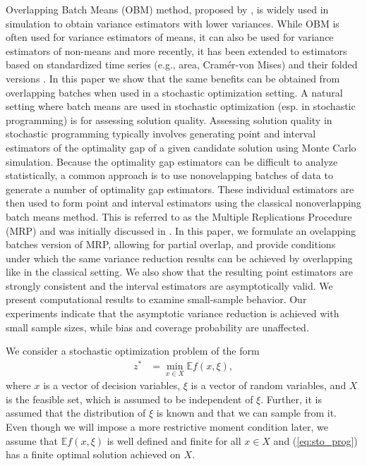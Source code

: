 \documentclass[12pt]{article}
\newcommand{\e}[1]{\mathbb{E} %
#1 %
}
\newcommand{\x}{x}
\newcommand{\xit}{\xi}
\begin{document}
Overlapping Batch Means (OBM) method, proposed by \citet{Meketon1984}, is widely used in simulation to obtain variance estimators with lower variances. 
While OBM is often used for variance estimators of means, it can also be used for variance estimators of non-means \citep{SAH90} and more recently, it has been extended to estimators based on standardized time series (e.g., area, Cram\'{e}r-von Mises) \citep{Alexopoulos01012007,Alexopoulos2007} and their folded versions \citep{Meterelliyoz_etal_12}.
In this paper we show that the same benefits can be obtained from overlapping batches when used in a stochastic optimization setting.  
A natural setting where batch means are used in stochastic optimization (esp. in stochastic programming) is for assessing solution quality. 
Assessing solution quality in stochastic programming typically involves generating point and interval estimators of the optimality gap of a given candidate solution using Monte Carlo simulation. 
Because the optimality gap estimators can be difficult to analyze statistically, a common approach is to use nonovelapping batches of data to generate a number of optimality gap estimators. 
These individual estimators are then used to form point and interval estimators using the classical nonoverlapping batch means method.
This is referred to as the Multiple Replications Procedure (MRP) and was initially discussed in \citep{Mak1999}.   
In this paper, we formulate an ovelapping batches version of MRP, allowing for partial overlap, and provide conditions under which the same variance reduction results can be achieved by overlapping like in the classical setting. 
We also show that the resulting point estimators are strongly consistent and the interval estimators are asymptotically valid. 
We present computational results to examine small-sample behavior. 
Our experiments indicate that the asymptotic variance reduction is achieved with small sample sizes, while bias and coverage probability are unaffected.

We consider a stochastic optimization problem of the form 
\begin{align} \tag{SP} \label{eq:sto_prog} 
	z^* & = \min_{\x \in X} \e{f(\x,\xit)},
\end{align}
where $\x$ is a vector of decision variables, $\xit$ is a vector of random variables, and $X$ is the feasible set, which is assumed to be independent of $\xit$.
Further, it is assumed that the distribution of $\xit$ is known and that we can sample from it.
Even though we will impose a more restrictive moment condition later, we assume that $\e{f(\x,\xit)}$ is well defined and finite for all $\x \in X$ and (\ref{eq:sto_prog}) has a finite optimal solution achieved on $X$.
\end{document}
